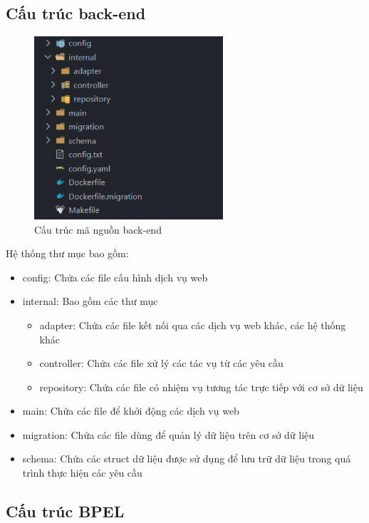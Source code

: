 \subsection{Cấu trúc back-end}
\begin{figure}[!htp]
    \begin{center}
        \includegraphics[width=7cm]{img/file-structure/back-end.png}
    \end{center}
    \caption{Cấu trúc mã nguồn back-end}
\end{figure}

Hệ thống thư mục bao gồm:
\begin{itemize}
    \item config: Chứa các file cấu hình dịch vụ web
    \item internal: Bao gồm các thư mục
          \begin{itemize}
              \item adapter: Chứa các file kết nối qua các dịch vụ web khác, các hệ thống khác
              \item controller: Chứa các file xử lý các tác vụ từ các yêu cầu
              \item repository: Chứa các file có nhiệm vụ tương tác trực tiếp với cơ sở dữ liệu
          \end{itemize}
    \item main: Chứa các file để khởi động các dịch vụ web
    \item migration: Chứa các file dùng để quản lý dữ liệu trên cơ sở dữ liệu
    \item schema: Chứa các struct dữ liệu được sử dụng để lưu trữ dữ liệu trong quá trình thực hiện các yêu cầu
\end{itemize}

\subsection{Cấu trúc BPEL}

